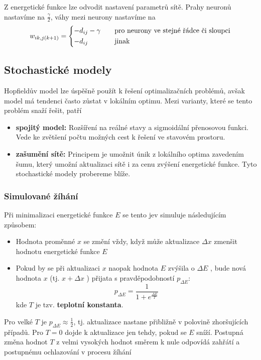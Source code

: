 \documentclass[11pt]{report} %
\numberwithin{equation}{section}
\begin{document}
\begin{description}
	Z energetické funkce lze odvodit nastavení parametrů sítě. Prahy neuronů nastavíme na $\frac{\gamma}{2}$, váhy mezi neurony nastavíme na 
	$$
	w_{ik,j(k+1)} = 
	\begin{dcases*}
	-d_{ij} - \gamma &\quad pro neurony ve stejné řádce či sloupci\\
	-d_{ij} &\quad jinak
	\end{dcases*}
	$$
\end{description}


\subsection{Stochastické modely}
Hopfieldův model lze úspěšně použít k řešení optimalizačních problémů, avšak model má tendenci často zůstat v lokálním optimu. Mezi varianty, které se tento problém snaží řešit, patří
\begin{itemize}
	
	
	\item \textbf{spojitý model:} Rozšíření na reálné stavy a sigmoidální přenosovou funkci. Vede ke zvětšení počtu možných cest k řešení ve stavovém prostoru.
	
	\item \textbf{zašumění sítě:} Principem je umožnit únik z lokálního optima zavedením šumu, který umožní aktualizaci sítě i za cenu zvýšení energetické funkce. Tyto stochastické modely probereme blíže.
\end{itemize}

\subsubsection{Simulované žíhání}
Při minimalizaci energetické funkce $E$ se tento jev simuluje následujícím způsobem:
\begin{itemize}
	
	
	\item Hodnota proměnné $x$ se změní vždy, když může aktualizace $\Delta x$ zmenšit hodnotu energetické funkce $E$
	\item Pokud by se při aktualizaci $x$ naopak hodnota $E$ zvýšila o $\Delta E$ , bude nová hodnota $x$ (tj. $x + \Delta x$ ) přijata s pravděpodobností $p_{\Delta E}$:
	$$p_{\Delta E} = \frac{1}{1 + e^{\frac{\Delta E}{T}}}$$
	kde $T$ je tzv. \textbf{teplotní konstanta}.
\end{itemize}

Pro velké $T$ je $p_{\Delta E} \approx \frac{1}{2}$, tj. aktualizace nastane přibližně v polovině zhoršujících případů. Pro $T = 0$ dojde k aktualizace jen tehdy, pokud se $E$ sníží. Postupná změna hodnot $T$ z velmi vysokých hodnot směrem k nule odpovídá zahřátí a postupnému ochlazování v procesu žíhání
\end{document}
